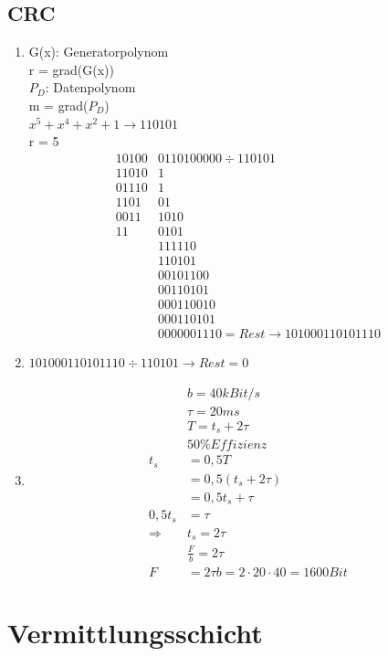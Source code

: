 \subsection{CRC}
\begin{enumerate}
\item G(x): Generatorpolynom\\
r = grad(G(x))\\
$P_D$: Datenpolynom\\
m = grad($P_D$)\\
$x^5+x^4+x^2+1 \to 110101$\\
r = 5
\begin{align*}
10100&0110100000 \div 110101 \\
11010&1\\
01110&1\\
 1101&01\\
 0011&1010\\
   11&0101\\
     &111110\\
     &110101\\
     &00101100\\
     &00110101\\
     &000110010\\
     &000110101\\
     &0000001110 = Rest \to 1010001101 01110
  \end{align*}
\item $101000110101110\div 110101 \to Rest = 0$
\item
\begin{align*}
&b = 40 kBit/s\\
&\tau = 20 ms\\
&T = t_s+ 2\tau\\
&50\% Effizienz\\
t_s &= 0,5T\\
&= 0,5(t_s + 2\tau)\\
&= 0,5 t_s + \tau\\
0,5 t_s &= \tau\\
\Rightarrow &t_s = 2 \tau\\
&\frac{F}{b} = 2\tau\\
F &= 2\tau b = 2 \cdot 20 \cdot 40 = 1600Bit
\end{align*}
\end{enumerate}
\section{Vermittlungsschicht}

